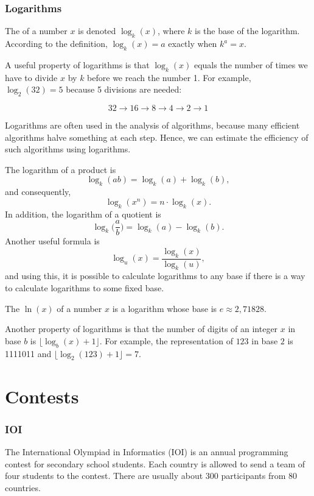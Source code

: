 \subsubsection{Logarithms}


The  of a number $x$
is denoted $\log_k(x)$, where $k$ is the base
of the logarithm.
According to the definition,
$\log_k(x)=a$ exactly when $k^a=x$.

A useful property of logarithms is
that $\log_k(x)$ equals the number of times
we have to divide $x$ by $k$ before we reach 
the number 1.
For example, $\log_2(32)=5$
because 5 divisions are needed:

\[32 \rightarrow 16 \rightarrow 8 \rightarrow 4 \rightarrow 2 \rightarrow 1 \]

Logarithms are often used in the analysis of
algorithms, because many efficient algorithms
halve something at each step.
Hence, we can estimate the efficiency of such algorithms
using logarithms.

The logarithm of a product is
\[\log_k(ab) = \log_k(a)+\log_k(b),\]
and consequently,
\[\log_k(x^n) = n \cdot \log_k(x).\]
In addition, the logarithm of a quotient is
\[\log_k\Big(\frac{a}{b}\Big) = \log_k(a)-\log_k(b).\]
Another useful formula is
\[\log_u(x) = \frac{\log_k(x)}{\log_k(u)},\]
and using this, it is possible to calculate
logarithms to any base if there is a way to
calculate logarithms to some fixed base.


The  $\ln(x)$ of a number $x$
is a logarithm whose base is $e \approx 2{,}71828$.

Another property of logarithms is that
the number of digits of an integer $x$ in base $b$ is
$\lfloor \log_b(x)+1 \rfloor$.
For example, the representation of
$123$ in base $2$ is 1111011 and
$\lfloor \log_2(123)+1 \rfloor = 7$.

\section{Contests}

\subsubsection{IOI}

The International Olympiad in Informatics (IOI)
is an annual programming contest for
secondary school students.
Each country is allowed to send a team of
four students to the contest.
There are usually about 300 participants
from 80 countries.

